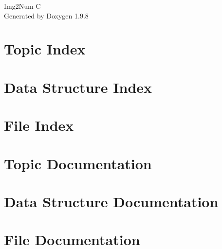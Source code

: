 \documentclass[twoside]{book}
\newcommand{\+}{\discretionary{\mbox{\scriptsize$\hookleftarrow$}}{}{}}
\newcommand{\clearemptydoublepage}{%
    \newpage{\pagestyle{empty}\cleardoublepage}%
  }
\begin{document}
  \raggedbottom
    \hypersetup{pageanchor=false,
                bookmarksnumbered=true,
                pdfencoding=unicode
               }
  \begin{titlepage}
  \vspace*{7cm}
  \begin{center}%
  {\Large Img2\+Num C}\\
  \vspace*{1cm}
  {\large Generated by Doxygen 1.9.8}\\
  \end{center}
  \end{titlepage}
  \clearemptydoublepage
  \tableofcontents
  \clearemptydoublepage
  \hypersetup{pageanchor=true}

\chapter{Topic Index}

\chapter{Data Structure Index}

\chapter{File Index}

\chapter{Topic Documentation}

\chapter{Data Structure Documentation}



\chapter{File Documentation}










  \backmatter
  \newpage
  \clearemptydoublepage
  \printindex
\end{document}

